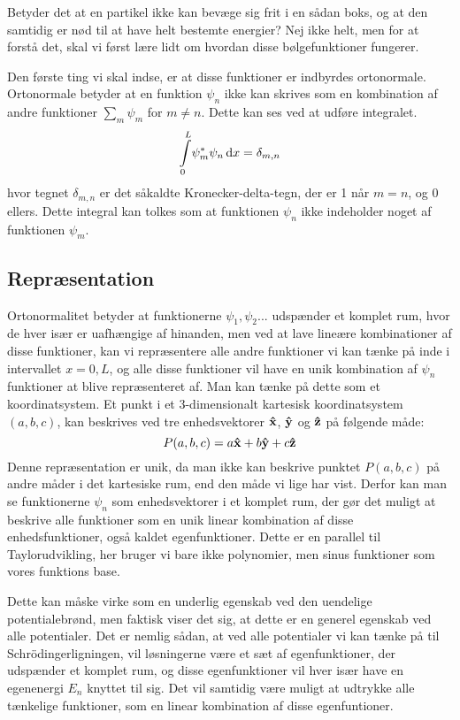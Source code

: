 \documentclass[../Kvantemekanik.tex]{subfiles}
\begin{document}
Betyder det at en partikel ikke kan bevæge sig frit i en sådan boks, og at den samtidig er nød til at have helt bestemte energier? Nej ikke helt, men for at forstå det, skal vi først lære lidt om hvordan disse bølgefunktioner fungerer.

Den første ting vi skal indse, er at disse funktioner er indbyrdes ortonormale. Ortonormale betyder at en funktion $\psi_n$ ikke kan skrives som en kombination af andre funktioner $\sum_m \psi_m$ for $m\neq n$. Dette kan ses ved at udføre integralet.
\begin{equation}
    \integral{\psi_m^*\psi_n}{x}{0}{L} = \delta_{m,n}
\end{equation}
hvor tegnet $\delta_{m,n}$ er det såkaldte Kronecker-delta-tegn, der er 1 når $m=n$, og 0 ellers. Dette integral kan tolkes som at funktionen $\psi_n$ ikke indeholder noget af funktionen $\psi_m$.

\subsection{Repræsentation}
Ortonormalitet betyder at funktionerne $\psi_1, \psi_2...$ udspænder et komplet rum, hvor de hver især er uafhængige af hinanden, men ved at lave lineære kombinationer af disse funktioner, kan vi repræsentere alle andre funktioner vi kan tænke på inde i intervallet $x=0,L$, og alle disse funktioner vil have en unik kombination af $\psi_n$ funktioner at blive repræsenteret af. Man kan tænke på dette som et koordinatsystem. Et punkt i et 3-dimensionalt kartesisk koordinatsystem $(a,b,c)$, kan beskrives ved tre enhedsvektorer $\xhat$, $\yhat$ og $\zhat$ på følgende måde:
\begin{equation*}
    P(a,b,c)=a\xhat+b\yhat+c\zhat
\end{equation*}
Denne repræsentation er unik, da man ikke kan beskrive punktet $P(a,b,c)$ på andre måder i det kartesiske rum, end den måde vi lige har vist. Derfor kan man se funktionerne $\psi_n$ som enhedsvektorer i et komplet rum, der gør det muligt at beskrive alle funktioner som en unik linear kombination af disse enhedsfunktioner, også kaldet egenfunktioner. Dette er en parallel til Taylorudvikling, her bruger vi bare ikke polynomier, men sinus funktioner som vores funktions base.

Dette kan måske virke som en underlig egenskab ved den uendelige potentialebrønd, men faktisk viser det sig, at dette er en generel egenskab ved alle potentialer. Det er nemlig sådan, at ved alle potentialer vi kan tænke på til Schrödingerligningen, vil løsningerne være et sæt af egenfunktioner, der udspænder et komplet rum, og disse egenfunktioner vil hver især have en egenenergi $E_n$ knyttet til sig. Det vil samtidig være muligt at udtrykke alle tænkelige funktioner, som en linear kombination af disse egenfuntioner. 
\end{document}
